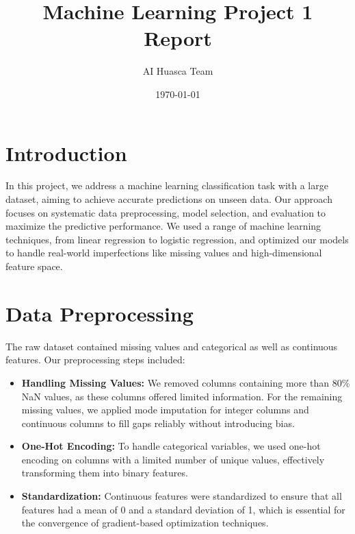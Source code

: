 \documentclass{article}
\title{Machine Learning Project 1 Report}
\author{AI Huasca Team}
\date{\today}
\begin{document}
\maketitle

\section{Introduction}
In this project, we address a machine learning classification task with a large dataset, aiming to achieve accurate predictions on unseen data. Our approach focuses on systematic data preprocessing, model selection, and evaluation to maximize the predictive performance. We used a range of machine learning techniques, from linear regression to logistic regression, and optimized our models to handle real-world imperfections like missing values and high-dimensional feature space.

\section{Data Preprocessing}
The raw dataset contained missing values and categorical as well as continuous features. Our preprocessing steps included:
\begin{itemize}
    \item \textbf{Handling Missing Values:} We removed columns containing more than 80\% NaN values, as these columns offered limited information. For the remaining missing values, we applied mode imputation for integer columns and continuous columns to fill gaps reliably without introducing bias.
    \item \textbf{One-Hot Encoding:} To handle categorical variables, we used one-hot encoding on columns with a limited number of unique values, effectively transforming them into binary features.
    \item \textbf{Standardization:} Continuous features were standardized to ensure that all features had a mean of 0 and a standard deviation of 1, which is essential for the convergence of gradient-based optimization techniques.
\end{itemize}
\end{document}
